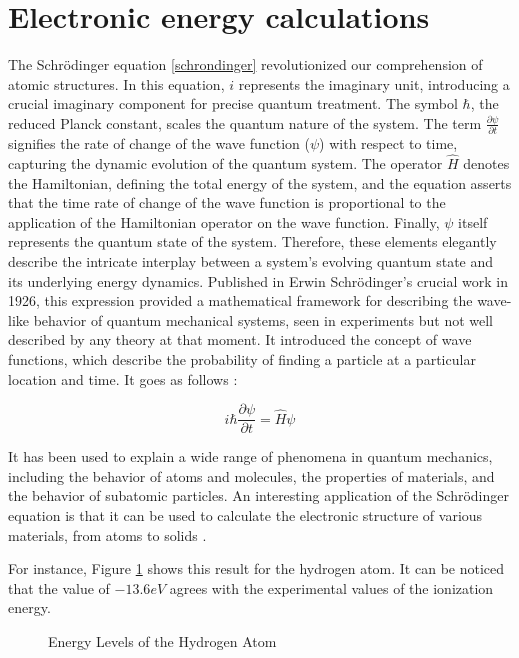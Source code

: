 \section{Electronic energy calculations}
The Schrödinger equation \ref{schrondinger} revolutionized our comprehension of atomic structures. In this equation, $i$ represents the imaginary unit, introducing a crucial imaginary component for precise quantum treatment. The symbol $\hbar$, the reduced Planck constant, scales the quantum nature of the system. The term $\frac{\partial \psi}{\partial t}$ signifies the rate of change of the wave function ($\psi$) with respect to time, capturing the dynamic evolution of the quantum system. The operator $\hat{H}$ denotes the Hamiltonian, defining the total energy of the system, and the equation asserts that the time rate of change of the wave function is proportional to the application of the Hamiltonian operator on the wave function. Finally, $\psi$ itself represents the quantum state of the system. Therefore, these elements elegantly describe the intricate interplay between a system's evolving quantum state and its underlying energy dynamics. Published in Erwin Schrödinger's crucial work in 1926, this expression provided a mathematical framework for describing the wave-like behavior of quantum mechanical systems, seen in experiments but not well described by any theory at that moment. It introduced the concept of wave functions, which describe the probability of finding a particle at a particular location and time. It goes as follows \cite{SchEq}:

\begin{equation}
\label{schrondinger}
i\hbar \frac{\partial \psi}{\partial t} = \hat{H} \psi
\end{equation}

It has been used to explain a wide range of phenomena in quantum mechanics, including the behavior of atoms and molecules, the properties of materials, and the behavior of subatomic particles. An interesting application of the Schrödinger equation is that it can be used to calculate the electronic structure of various materials, from atoms to solids \cite{SchEq}.

For instance, Figure \ref{e_h} shows this result for the hydrogen atom. It can be noticed that the value of $-13.6eV$ agrees with the experimental values of the ionization energy.
\begin{figure}[!ht]
        \centering
        
        \caption{Energy Levels of the Hydrogen Atom}
        \label{e_h}
\end{figure}

